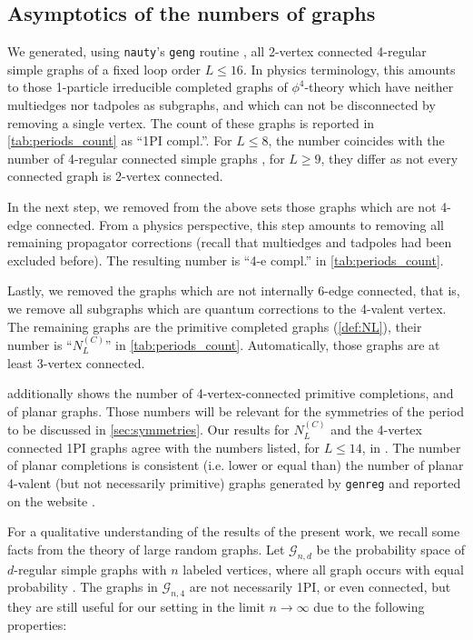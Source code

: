 \documentclass[11pt,a4paper]{article}
\renewcommand{\|}{\rule[-0.4ex]{0.2ex}{1.2em}}
\begin{document}
\subsection{Asymptotics of the numbers of graphs}\label{sec:asymptotics}



We generated, using \texttt{nauty}'s \texttt{geng} routine \cite{mckay_practical_2014}, all 2-vertex connected 4-regular simple graphs of a fixed loop order $L \leq 16$. In physics terminology, this amounts to those 1-particle irreducible completed graphs of $\phi^4$-theory which have neither multiedges   nor  tadpoles as subgraphs, and which can not be disconnected by removing a single vertex. The count of these graphs is reported in \cref{tab:periods_count} as \enquote{1PI compl.}. For $L\leq 8$, the number coincides with the number of 4-regular connected  simple graphs \cite[A006820]{oeis}, for $L \geq 9$, they differ as not every connected graph is 2-vertex connected. 

In the next step, we removed from the above sets  those graphs which are not 4-edge connected. From a physics perspective, this step amounts to removing all remaining propagator corrections (recall that multiedges and tadpoles had been excluded before). The resulting number is \enquote{4-e compl.} in \cref{tab:periods_count}.

Lastly, we removed the graphs which are not internally 6-edge connected, that is, we remove all subgraphs which are quantum corrections to the 4-valent vertex. The remaining graphs are the primitive completed graphs  (\cref{def:NL}), their number is \enquote{$N^{(C)}_L$} in \cref{tab:periods_count}. Automatically, those graphs are at least 3-vertex connected.


 additionally shows the number of 4-vertex-connected primitive completions, and of planar graphs. Those numbers will be relevant for the symmetries of the period to be discussed in \cref{sec:symmetries}. Our results for $N^{(C)}_L$ and the 4-vertex connected 1PI graphs agree with the numbers listed, for $L\leq 14$, in \cite{schnetz_quantum_2010}.
The number of planar completions is consistent (i.e. lower or equal than) the number of planar 4-valent (but not necessarily primitive) graphs generated by \texttt{genreg} \cite{meringer_fast_1999} and reported on the website \cite{meringer_regular_2009}.





For a qualitative understanding of the results of the present work, we recall some facts from the theory of large random graphs. Let $\mathcal{G}_{n,d}$ be the probability space of $d$-regular  simple graphs  with $n$ labeled vertices, where all graph occurs with equal probability \cite{wormald_models_1999,bollobas_random_2001,bollobas_modern_1998}. The graphs in $\mathcal{G}_{n,4}$ are not necessarily 1PI, or even connected,  but they are still useful for our setting in the limit $n \rightarrow \infty$ due to the following properties:
\end{document}
